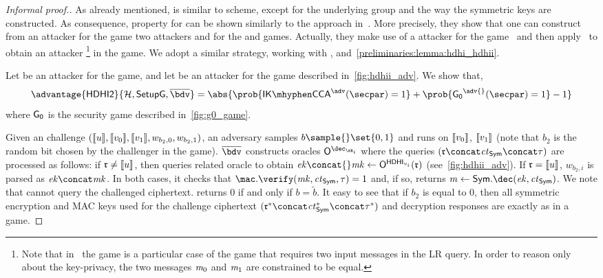 \begin{proof}[Informal proof.]
    As already mentioned, \dhaes{} is similar to \dhies{} scheme, except for the underlying group and the way the symmetric keys are constructed. As consequence, \ikcca{} property for \dhaes{} can be shown similarly to the approach in~\cite[Theorem 6.2]{abdalla2010robust}. More precisely, they show that one can construct from an attacker \adv{} for the \ikcca{} game two attackers \bdv{} and \cdv{} for the \odh{} and \sufcma{} games. Actually, they make use of a \bdvii{} attacker for the \odhii{} game~\cite[Figure 20]{abdalla2010robust} and then apply~\cite[Lemma 6.1]{abdalla2010robust} to obtain an attacker \bdv{}\footnote{Note that in~\cite{abdalla2010robust} the \ikcca{} game is a particular case of the \aicca{} game that requires two input messages in the LR query. In order to reason only about the key-privacy, the two messages $\mathit{m}_0$ and $\mathit{m}_1$ are constrained to be equal.} in the \odh{} game. We adopt a similar strategy, working with \hdhi{}, \hdhii{} and~\cref{preliminaries:lemma:hdhi_hdhii}.

    Let \adv{} be an attacker for the \ikcca{} game, and let \bdvii{} be an attacker for the \hdhii{} game described in~\cref{fig:hdhii_adv}. We show that,
    \[
        \advantage{\hdhii}{\hashSet, \groupSetup, \bdvii{}} = \abs{\prob{\ikcca^{\adv}(\secpar)=1} + \prob{\gamestyle{G_0}^{\adv{}} (\secpar)= 1}-1}
    \]
    where $\mathsf{G_0}$ is the security game described in~\cref{fig:g0_game}.

    Given an \hdhii{} challenge $(\llbracket {u} \rrbracket, \llbracket {v_{0}} \rrbracket, \llbracket {v_{1}} \rrbracket, w_{b_2, 0}, w_{b_2, 1})$, an adversary \bdvii{} samples $b \sample{} \set{0,1}$ and runs \adv{} on $\llbracket {v_{0}} \rrbracket$, $\llbracket {v_{1}} \rrbracket$ (note that $b_2$ is the random bit chosen by the \bdvii{} challenger in the \hdhii{} game). $\bdvii$ constructs oracles $\oracle{\dec_{\sk_i}}$ where the queries $(\gel{r} \concat \ct_{\sym} \concat \tau)$ are processed as follows: if $\mathfrak{r} \neq \llbracket {u} \rrbracket$, then \bdvii{} queries related \hdhii{} oracle to obtain $\ek{} \concat{} \mk\gets{} \oracleHdhi{v_i}(\gel{r})$ (see~\cref{fig:hdhii_adv}). If $\mathfrak{r}=\llbracket {u} \rrbracket$, $w_{b_2, i}$ is parsed as $\ek \concat \mk$. In both cases, it checks that $\mac.\verify(\mk, \ct_{\sym},\tau) = 1$ and, if so, returns $\msg \gets{} \sym.\dec(\ek,\ct_{\sym})$. We note that \adv{} cannot query the challenged ciphertext. \bdvii{} returns $0$ if and only if $b=\widetilde{b}$. It easy to see that if $b_2$ is equal to $0$, then all symmetric encryption and MAC keys used for the challenge ciphertext $(\gel{r}^{*} \concat \ct_{\sym}^{*} \concat \tau^{*})$ and decryption responses are exactly as in a \dhaes{} game.


\end{proof}
